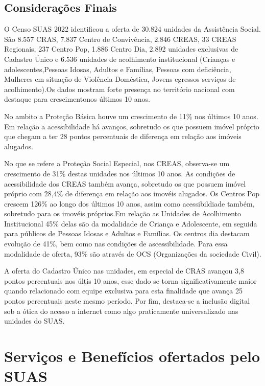 \documentclass[
  brazilian]{report}
\begin{document}
\hypertarget{considerauxe7uxf5es-finais-1}{%
\section{Considerações Finais}\label{considerauxe7uxf5es-finais-1}}

O Censo SUAS 2022 identificou a oferta de 30.824 unidades da Assistência
Social. São 8.557 CRAS, 7.837 Centro de Convivência, 2.846 CREAS, 33
CREAS Regionais, 237 Centro Pop, 1.886 Centro Dia, 2.892 unidades
exclusivas de Cadastro Único e 6.536 unidades de acolhimento
institucional (Crianças e adolescentes,Pessoas Idosas, Adultos e
Famílias, Pessoas com deficiência, Mulheres em situação de Violência
Doméstica, Jovens egressos serviços de acolhimento).Os dados mostram
forte presença no território nacional com destaque para crescimentonos
últimos 10 anos.

No ambito a Proteção Básica houve um crescimento de 11\% nos últimos 10
anos. Em relação a acessibilidade há avanços, sobretudo os que possuem
imóvel próprio que chegam a ter 28 pontos percentuais de diferença em
relação aos imóveis alugados.

No que se refere a Proteção Social Especial, nos CREAS, observa-se um
crescimento de 31\% destas unidades nos últimos 10 anos. As condições de
acessibilidade dos CREAS também avança, sobretudo os que possuem imóvel
próprio com 28,4\% de diferença em relação aos imovéis alugados. Os
Centros Pop crescem 126\% ao longo dos últimos 10 anos, assim como
acessibildiade também, sobretudo para os imovéis próprios.Em relação as
Unidades de Acolhimento Institucional 45\% delas são da modalidade de
Criança e Adolescente, em seguida para públicos de Pessoas Idosas e
Adultos e Famílias. Os centros dia destacam evolução de 41\%, bem como
nas condições de ascessibilidade. Para essa modalidade de oferta, 93\%
são através de OCS (Organizações da sociedade Civil).

A oferta do Cadastro Único nas unidades, em especial de CRAS avançou 3,8
pontos percentuais nos últis 10 anos, esse dado se torna
significativamente maior quando relacionado com equipe exclusiva para
esta finalidade que avança 25 pontos percentuais neste mesmo período.
Por fim, destaca-se a inclusão digital sob a ótica do acesso a internet
como algo praticamente universalizado nas unidades do SUAS.

\hypertarget{serviuxe7os-e-benefuxedcios-ofertados-pelo-suas}{%
\chapter{Serviços e Benefícios ofertados pelo
SUAS}\label{serviuxe7os-e-benefuxedcios-ofertados-pelo-suas}}
\end{document}
